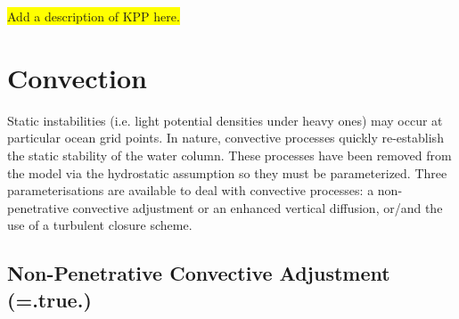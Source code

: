 \colorbox{yellow}{Add a description of KPP here.}


\section{Convection}
\label{ZDF_conv}


Static instabilities (i.e. light potential densities under heavy ones) may 
occur at particular ocean grid points. In nature, convective processes 
quickly re-establish the static stability of the water column. These 
processes have been removed from the model via the hydrostatic 
assumption so they must be parameterized. Three parameterisations 
are available to deal with convective processes: a non-penetrative 
convective adjustment or an enhanced vertical diffusion, or/and the 
use of a turbulent closure scheme.

\subsection   [Non-Penetrative Convective Adjustment (\np{ln\_tranpc}) ]
			{Non-Penetrative Convective Adjustment (=.true.) }
\label{ZDF_npc}


